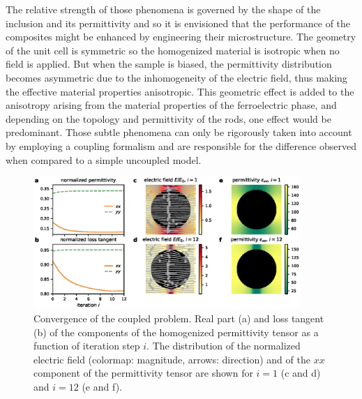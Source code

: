 \documentclass[%
 reprint,
 amsmath,amssymb,
 aps,
]{revtex4-2}
\begin{document}
 The relative strength of those phenomena is governed by the shape of the inclusion and its permittivity
 and so it is envisioned that the performance of the composites might be enhanced by engineering
 their microstructure.
 The geometry of the unit cell is symmetric so the homogenized material is
  isotropic when no field is applied.
 But when the sample is biased, the permittivity distribution becomes asymmetric due
 to the inhomogeneity of the electric field, thus making the effective material properties anisotropic.
This geometric effect is added to the anisotropy arising from the material properties of the ferroelectric
phase, and depending on the topology and permittivity of the rods, one effect would be predominant.
Those subtle phenomena can only be rigorously taken into account by employing a coupling formalism
and are responsible for the difference observed when compared to a simple uncoupled model.\\

\begin{figure}[!t]
\centering
\includegraphics[width=0.9\textwidth]{conv_per}
\caption{Convergence of the coupled problem.
Real part (a) and loss tangent (b) of the components of the homogenized
 permittivity tensor as a function of iteration step $i$. The distribution of
 the normalized electric field (colormap: magnitude, arrows: direction) and of the
 $xx$ component of the permittivity tensor are shown for $i=1$
  (c and d) and $i=12$ (e and f).
 }
\label{conv2D}
\end{figure}
\end{document}
